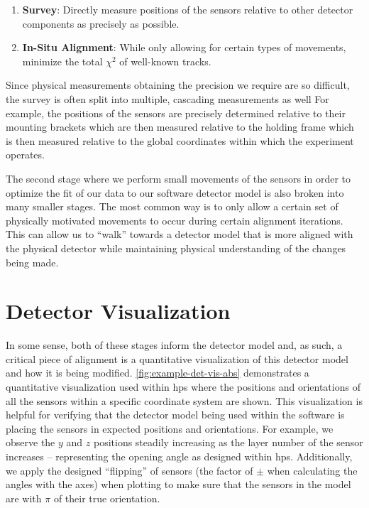 \begin{enumerate}
  \item \textbf{Survey}: Directly measure positions of the sensors relative to other
        detector components as precisely as possible.
  \item \textbf{In-Situ Alignment}: While only allowing for certain types of movements,
        minimize the total $\chi^2$ of well-known tracks.
\end{enumerate}

Since physical measurements obtaining the precision we require are so difficult, the survey is
often split into multiple, cascading measurements as well For example, the positions of the sensors
are precisely determined relative to their mounting brackets which are then measured relative to
the holding frame which is then measured relative to the global coordinates within which the
experiment operates.

The second stage where we perform small movements of the sensors in order to optimize the fit of
our data to our software detector model is also broken into many smaller stages. The most common
way is to only allow a certain set of physically motivated movements to occur during certain
alignment iterations. This can allow us to ``walk'' towards a detector model that is more aligned
with the physical detector while maintaining physical understanding of the changes being made.

\section{Detector Visualization}

In some sense, both of these stages inform the detector model and, as such, a critical piece of
alignment is a quantitative visualization of this detector model and how it is being modified.
\cref{fig:example-det-vis-abs} demonstrates a quantitative visualization used within \ac{hps} where
the positions and orientations of all the sensors within a specific coordinate system are shown.
This visualization is helpful for verifying that the detector model being used within the software
is placing the sensors in expected positions and orientations. For example, we observe the $y$ and
$z$ positions steadily increasing as the layer number of the sensor increases -- representing the
opening angle as designed within \ac{hps}. Additionally, we apply the designed ``flipping'' of
sensors (the factor of $\pm$ when calculating the angles with the axes)
when plotting to make sure that the sensors in the model are with $\pi$ of their true orientation.

